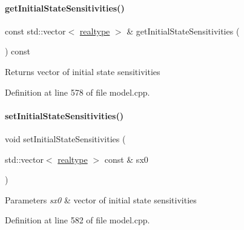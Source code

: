\paragraph{\texorpdfstring{get\+Initial\+State\+Sensitivities()}{getInitialStateSensitivities()}}
{\footnotesize\ttfamily const std\+::vector$<$ \mbox{\hyperlink{namespaceamici_a1bdce28051d6a53868f7ccbf5f2c14a3}{realtype}} $>$ \& get\+Initial\+State\+Sensitivities (\begin{DoxyParamCaption}{ }\end{DoxyParamCaption}) const}

\begin{DoxyReturn}{Returns}
vector of initial state sensitivities 
\end{DoxyReturn}


Definition at line 578 of file model.\+cpp.

\mbox{\label{classamici_1_1_model_a82941b121d9db31d357642092a2cd41d}} 
\paragraph{\texorpdfstring{set\+Initial\+State\+Sensitivities()}{setInitialStateSensitivities()}}
{\footnotesize\ttfamily void set\+Initial\+State\+Sensitivities (\begin{DoxyParamCaption}\item[{std\+::vector$<$ \mbox{\hyperlink{namespaceamici_a1bdce28051d6a53868f7ccbf5f2c14a3}{realtype}} $>$ const \&}]{sx0 }\end{DoxyParamCaption})}


\begin{DoxyParams}{Parameters}
{\em sx0} & vector of initial state sensitivities \\
\hline
\end{DoxyParams}


Definition at line 582 of file model.\+cpp.

